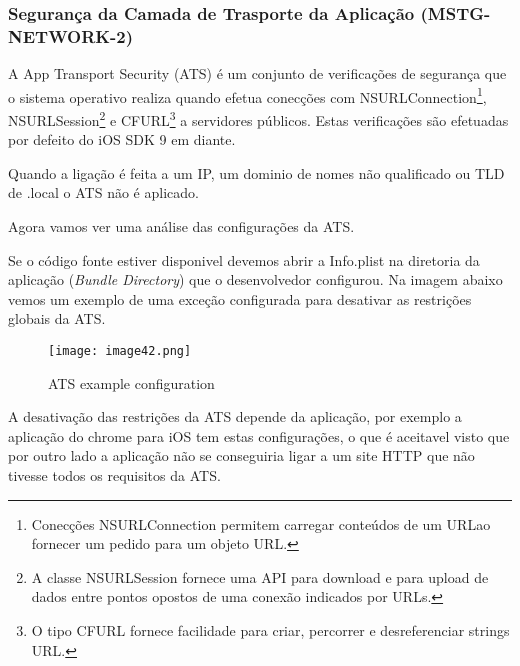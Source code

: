 \subsubsection{Segurança da Camada de Trasporte da Aplicação (MSTG-NETWORK-2)}
\hfill\par
\hfill\par
 A App Transport Security (ATS) é um conjunto de verificações de segurança que o sistema operativo realiza quando efetua conecções com NSURLConnection\footnote[6]{ Conecções NSURLConnection permitem carregar conteúdos de um URLao fornecer um pedido para um objeto URL\cite{ref_intro4}.}, NSURLSession\footnote[7]{A classe NSURLSession fornece uma API para download e para upload de dados entre pontos opostos de uma conexão indicados por URLs\cite{ref_intro5}.} e CFURL\footnote[8]{ O tipo CFURL fornece facilidade para criar, percorrer e desreferenciar strings URL\cite{ref_intro6}.} a servidores públicos. Estas verificações são efetuadas por defeito do iOS SDK 9 em diante.\par
Quando a ligação é feita a um IP, um dominio de nomes não qualificado ou TLD de .local o ATS não é aplicado.\par
\hfill\par
Agora vamos ver uma análise das configurações da ATS.\par

Se o código fonte estiver disponivel devemos abrir a Info.plist na diretoria da aplicação (\textit{Bundle Directory}) que o desenvolvedor configurou. Na imagem abaixo vemos um exemplo de uma exceção configurada para desativar as restrições globais da ATS.

\begin{figure}[H]
\centering
\texttt{[image: image42.png]}
\caption {ATS example configuration}
\label {fig02}
\end{figure}

A desativação das restrições da ATS depende da aplicação, por exemplo a aplicação do chrome para iOS tem estas configurações, o que é aceitavel visto que por outro lado a aplicação não se conseguiria ligar a um site HTTP que não tivesse todos os requisitos da ATS.

